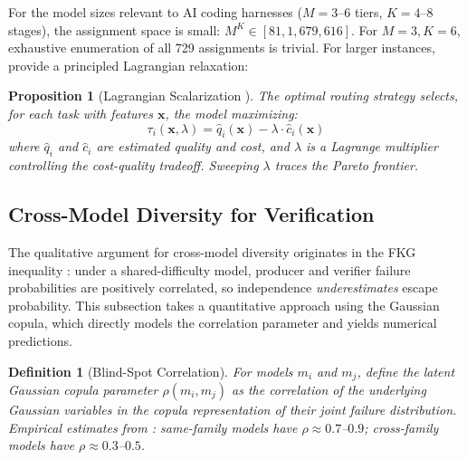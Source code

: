 \documentclass[11pt, a4paper]{googledeepmind}
\newtheorem{definition}{Definition}[section]
\newtheorem{proposition}{Proposition}[section]
\begin{document}
For the model sizes relevant to AI coding harnesses ($M = 3$--$6$ tiers, $K = 4$--$8$ stages), the assignment space is small: $M^K \in [81, 1{,}679{,}616]$. For $M = 3, K = 6$, exhaustive enumeration of all 729 assignments is trivial. For larger instances, \citet{dekoninck2025cascade} provide a principled Lagrangian relaxation:

\begin{proposition}[Lagrangian Scalarization {\citep{dekoninck2025cascade}}]
\label{prop:routing-lagrangian}
The optimal routing strategy selects, for each task with features $\mathbf{x}$, the model maximizing:
\begin{equation}
\tau_i(\mathbf{x}, \lambda) = \hat{q}_i(\mathbf{x}) - \lambda \cdot \hat{c}_i(\mathbf{x})
\end{equation}
where $\hat{q}_i$ and $\hat{c}_i$ are estimated quality and cost, and $\lambda$ is a Lagrange multiplier controlling the cost-quality tradeoff. Sweeping $\lambda$ traces the Pareto frontier.
\end{proposition}

\subsection{Cross-Model Diversity for Verification}

The qualitative argument for cross-model diversity originates in the FKG inequality \citep{fkg1971}: under a shared-difficulty model, producer and verifier failure probabilities are positively correlated, so independence \emph{underestimates} escape probability. This subsection takes a quantitative approach using the Gaussian copula, which directly models the correlation parameter and yields numerical predictions.

\begin{definition}[Blind-Spot Correlation]
\label{def:routing-blindspot}
For models $m_i$ and $m_j$, define the latent Gaussian copula parameter $\rho(m_i, m_j)$ as the correlation of the underlying Gaussian variables in the copula representation of their joint failure distribution. Empirical estimates from \citet{correlatedensemble2026}: same-family models have $\rho \approx 0.7$--$0.9$; cross-family models have $\rho \approx 0.3$--$0.5$.
\end{definition}
\end{document}
